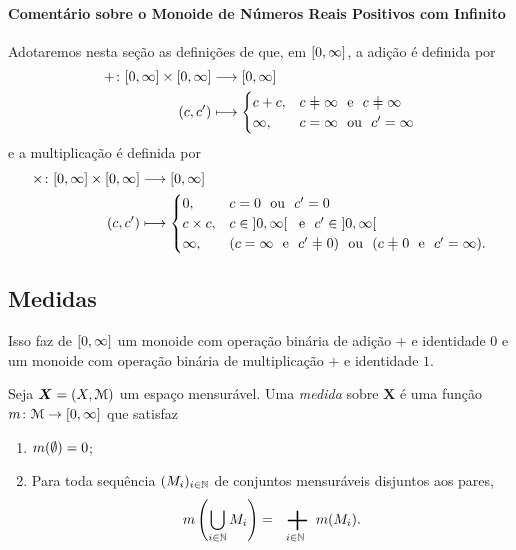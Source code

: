 \paragraph{Comentário sobre o Monoide de Números Reais Positivos com Infinito}

Adotaremos nesta seção as definições de que, em $\left[{0},{\infty}\right]$, a adição é definida por
	\begin{align*}
	\func{+}{\intff{0}{\infty} \times \intff{0}{\infty}}{\intff{0}{\infty}}{(c,c')}{
		\begin{cases}
			c+c,& c \neq \infty \e c \neq \infty \\
			\infty,& c=\infty \ou c'=\infty
		\end{cases}
	}
	\end{align*}
e a multiplicação é definida por
	\begin{align*}
	\func{\times}{\intff{0}{\infty} \times \intff{0}{\infty}}{\intff{0}{\infty}}{(c,c')}{
		\begin{cases}
			0,& c=0 \ou c'=0 \\
			c \times c,& c \in \intaa{0}{\infty} \e c' \in \intaa{0}{\infty} \\
			\infty,& (c=\infty \e c' \neq 0) \ou (c \neq 0 \e c'=\infty).
		\end{cases}
	}
	\end{align*}

\subsection{Medidas}

Isso faz de $\left[{0},{\infty}\right]$ um monoide com operação binária de adição $+$ e identidade $0$ e um monoide com operação binária de multiplicação $+$ e identidade $1$.

\begin{definition}
Seja $\bm X=(X,\mathcal{M})$ um espaço mensurável. Uma \emph{medida} sobre $\bm X$ é uma função $m\colon \mathcal{M} \to \left[{0},{\infty}\right]$ que satisfaz
	\begin{enumerate}
	\item $m(\emptyset)=0$;
	\item Para toda sequência $(M_i)_{i \in \mathbb{N}}$ de conjuntos mensuráveis disjuntos aos pares,
	\begin{equation*}
	\med\left(\bigcup_{i \in \N} M_i\right)=\sum_{i \in \N} \med(M_i).
	\end{equation*}
	\end{enumerate}
\end{definition}

